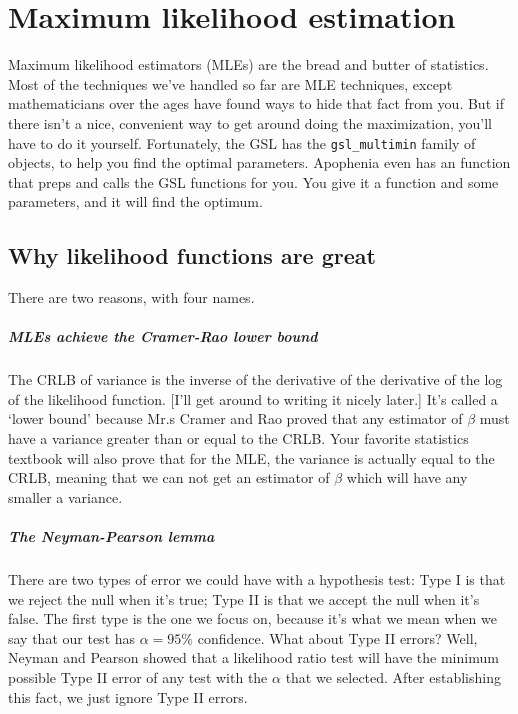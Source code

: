 \chapter{Maximum likelihood estimation} \label{mle}

Maximum likelihood estimators (MLEs) are the bread and butter of
statistics. Most of the techniques we've handled so far are MLE
techniques, except mathematicians over the ages have found ways to hide
that fact from you. But if there isn't a nice, convenient way to get
around doing the maximization, you'll have to do it yourself. Fortunately,
the GSL has the {\tt gsl\_multimin} family of objects, to help you find
the optimal parameters. Apophenia even has an 
function that preps and calls the GSL functions for you. You give it a
function and some parameters, and it will find the optimum.


\section{Why likelihood functions are great} There are two reasons, with four names.

\paragraph{MLEs achieve the Cramer-Rao lower bound} The CRLB of variance
is the inverse of the derivative of the derivative of the log of the
likelihood function. [I'll get around to writing it nicely later.] It's
called a `lower bound' because Mr.s Cramer and Rao proved that any
estimator of $\beta$ must have a variance greater than or equal to the
CRLB. Your favorite statistics textbook will also prove that for the MLE,
the variance is actually equal to the CRLB, meaning that we can not get
an estimator of $\beta$ which will have any smaller a variance.

\paragraph{The Neyman-Pearson lemma} There are two types of error we could
have with a hypothesis test: Type I is that we reject the null when it's
true; Type II is that we accept the null when it's false. The first type
is the one we focus on, because it's what we mean when we say that our
test has $\alpha=95\%$ confidence. What about Type II errors? Well, Neyman
and Pearson showed that a likelihood ratio test will have the minimum
possible Type II error of any test with the $\alpha$ that we selected. After establishing this fact, we
just ignore Type II errors.

